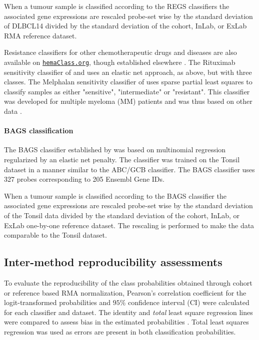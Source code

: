\documentclass[10pt,letterpaper]{article}
\newcommand{\hemaClass}{\href{http://hemaClass.org}{\texttt{hemaClass.org}}}
\begin{document}
When a tumour sample is classified according to the REGS classifiers the associated gene expressions are rescaled probe-set wise by the standard deviation of DLBCL14 divided by the standard deviation of the cohort, InLab, or ExLab RMA reference dataset.

Resistance classifiers for other chemotherapeutic drugs and diseases are also available on \hemaClass{}, though established elsewhere \cite{Boegsted2011,Bogsted2013,Laursen2014}.
The Rituximab sensitivity classifier of \cite{Laursen2014} and \cite{Laursen2015} uses an elastic net approach, as above, but with three classes.
The Melphalan sensitivity classifier of \cite{Boegsted2011} uses sparse partial least squares to classify samples as either "sensitive", "intermediate" or "resistant". This classifier was developed for multiple myeloma (MM) patients and was thus based on other data \cite{Boegsted2011}.


\paragraph{BAGS classification}
The BAGS classifier established by \cite{DybkaerBoegsted2015} was based on multinomial regression regularized by an elastic net penalty.
The classifier was trained on the Tonsil dataset in a manner similar to the ABC/GCB classifier. The BAGS classifier uses 327 probes corresponding to 205 Ensembl Gene IDs.

When a tumour sample is classified according to the BAGS classifier the associated gene expressions are rescaled probe-set wise by the standard deviation of the Tonsil data divided by the standard deviation of the cohort, InLab, or ExLab one-by-one reference dataset. The rescaling is performed to make the data comparable to the Tonsil dataset.


\subsection*{Inter-method reproducibility assessments}
To evaluate the reproducibility of the class probabilities obtained through cohort or reference based RMA normalization, Pearson's correlation coefficient for the logit-transformed probabilities and $95\%$ confidence interval (CI) were calculated for each classifier and dataset.
The identity and \emph{total} least square regression lines were compared to assess bias in the estimated probabilities \cite{CHEN1989}.
Total least squares regression was used as errors are present in both classification probabilities.
\end{document}
